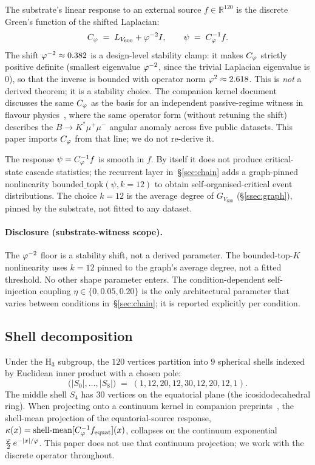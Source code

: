 The substrate's linear response to an external source $f \in \mathbb{R}^{120}$
is the discrete Green's function of the shifted Laplacian:
\begin{equation}\label{eq:cphi}
C_{\varphi} \;=\; L_{V_{600}} + \varphi^{-2} I,
\qquad
\psi \;=\; C_{\varphi}^{-1} f.
\end{equation}
The shift $\varphi^{-2} \approx 0.382$ is a design-level stability
clamp: it makes $C_{\varphi}$ strictly positive definite (smallest eigenvalue
$\varphi^{-2}$, since the trivial Laplacian eigenvalue is $0$), so that the
inverse is bounded with operator norm $\varphi^{2}\approx 2.618$. This is
\emph{not} a derived theorem; it is a stability choice. The companion
kernel document~\citep{SmartAriaClosureKernel2026} discusses the same
$C_{\varphi}$ as the basis for an independent passive-regime witness in
flavour physics~\citep{SmartBAnomaly2026}, where the same operator
form (without retuning the shift) describes the
$B\to K^{*}\mu^{+}\mu^{-}$ angular anomaly across five public datasets.
This paper imports $C_{\varphi}$ from that line; we do not re-derive it.

The response $\psi = C_{\varphi}^{-1} f$ is smooth in $f$. By itself it does
not produce critical-state cascade statistics; the recurrent layer
in~\S\ref{sec:chain} adds a graph-pinned nonlinearity
$\mathrm{bounded\_topk}(\psi, k\!=\!12)$ to obtain self-organised-critical
event distributions. The choice $k\!=\!12$ is the average degree of
$G_{V_{600}}$ (\S\ref{ssec:graph}), pinned by the substrate, not
fitted to any dataset.

\paragraph{Disclosure (substrate-witness scope).}
The $\varphi^{-2}$ floor is a stability shift, not a derived parameter.
The bounded-top-$K$ nonlinearity uses $k\!=\!12$ pinned to the graph's
average degree, not a fitted threshold. No other shape parameter
enters. The condition-dependent self-injection coupling
$\eta\in\{0, 0.05, 0.20\}$ is the only architectural parameter that
varies between conditions in~\S\ref{sec:chain}; it is reported
explicitly per condition.

\subsection{Shell decomposition}\label{ssec:shells}

Under the H$_3$ subgroup, the $120$ vertices partition into $9$
spherical shells indexed by Euclidean inner product with a chosen pole:
\[
\bigl(|S_0|,\ldots,|S_8|\bigr) \;=\; (1, 12, 20, 12, 30, 12, 20, 12, 1).
\]
The middle shell $S_{4}$ has $30$ vertices on the equatorial plane
(the icosidodecahedral ring). When projecting onto a continuum kernel
in companion preprints~\citep{SmartAriaClosureKernel2026}, the
shell-mean projection of the equatorial-source response,
$\kappa(x) = \mathrm{shell\text{-}mean}[C_{\varphi}^{-1} f_{\mathrm{equat}}](x)$,
collapses on the continuum exponential $\frac{\varphi}{2}\,e^{-|x|/\varphi}$.
This paper does not use that continuum projection; we work with the
discrete operator throughout.

